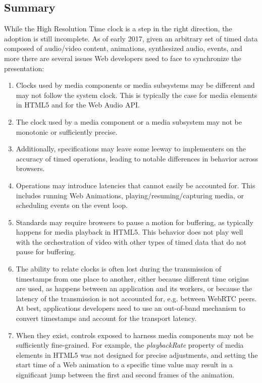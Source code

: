 \subsection{Summary}

While the High Resolution Time clock is a step in the right direction, the
adoption is still incomplete. As of early 2017, given an arbitrary set of
timed data composed of audio/video content, animations, synthesized audio,
events, and more there are several issues Web developers need to face to
synchronize the presentation:


\begin{enumerate}

\item{
Clocks used by media components or media subsystems may be different and may
not follow the system clock. This is typically the case for media elements in
HTML5 and for the Web Audio API.
}

\item{
The clock used by a media component or a media subsystem may not be monotonic
or sufficiently precise.
}

\item{
Additionally, specifications may leave some leeway to implementers on the
accuracy of timed operations, leading to notable differences in behavior
across browsers.
}

\item{
Operations may introduce latencies that cannot easily be accounted for. This
includes running Web Animations, playing/resuming/capturing media, or
scheduling events on the event loop.
}

\item{
Standards may require browsers to pause a motion for buffering, as typically
happens for media playback in HTML5. This behavior does not play well with the
orchestration of video with other types of timed data that do not pause for
buffering.
}

\item{ The ability to relate clocks is often lost during the transmission of
timestamps from one place to another, either because different time origins
are used, as happens between an application and its workers, or because the
latency of the transmission is not accounted for, e.g. between WebRTC peers.
At best, applications developers need to use an out-of-band mechanism to
convert timestamps and account for the transport latency. }

\item{
When they exist, controls exposed to harness media components may not be
sufficiently fine-grained. For example, the \emph{playbackRate} property of media
elements in HTML5 was not designed for precise adjustments, and setting the
start time of a Web animation to a specific time value may result in a
significant jump between the first and second frames of the animation.
}

\end{enumerate}

